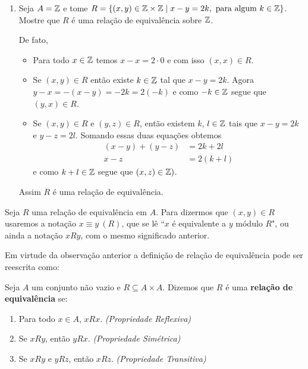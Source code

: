 \begin{exemplos}
\begin{enumerate}
		\item Seja $A = \mathbb{Z}$ e tome $R = \{(x,y)\in \mathbb{Z} \times \mathbb{Z} \mid x - y = 2k, \mbox{ para algum } k \in \mathbb{Z}\}$. Mostre que $R$
		é uma rela{\c c}{\~a}o de equival{\^e}ncia sobre $\mathbb{Z}$.
		\begin{solucao}
			De fato,
			\begin{itemize}
				\item Para todo $x\in\mathbb{Z}$ temos $x - x = 2\cdot0$ e com isso $(x,x) \in R$.
				\item Se $(x,y) \in R$ então existe $k \in \mathbb{Z}$ tal que $x - y = 2k$. Agora $y - x = -(x - y) = -2k = 2 (-k)$ 
				e como $-k \in \mathbb{Z}$ segue que $(y,x) \in R$.
				\item Se $(x,y) \in R$ e $(y,z) \in R$, então existem $k$, $l\in \mathbb{Z}$ tais que $x - y = 2k$ e $y - z = 2l$.
				Somando essas duas equações obtemos
				\begin{align*}
					(x - y) + (y - z) &= 2k + 2l\\
					x - z &= 2(k + l)
				\end{align*}
				e como $k + l \in \mathbb{Z}$ segue que $(x,z) \in \mathbb{Z})$.
			\end{itemize}
			Assim $R$ é uma relação de equivalência.
		\end{solucao}
	\end{enumerate}
\end{exemplos}
\begin{observacao}
	Seja $R$ uma rela{\c c}{\~a}o de equival{\^e}ncia em $A$. Para dizermos que $(x,y) \in R$ usaremos a nota{\c c}{\~a}o $x\equiv y\ (R)$, que se l{\^e} ``$x$ é equivalente a $y$ m{\'o}dulo $R$", ou ainda a nota{\c c}{\~a}o $xRy$, com o mesmo significado anterior.
\end{observacao}

Em virtude da observação anterior a definição de relação de equivalência pode ser reescrita como:

\begin{definicao}
	Seja $A$ um conjunto n{\~a}o vazio e $R\subseteq A \times A$. Dizemos que $R$ {\'e} uma \textbf{rela{\c c}{\~a}o de equival{\^e}ncia} se:
	\begin{enumerate}[label={\roman*})]
		\item Para todo $x \in A$, $xRx$. \textit{(Propriedade Reflexiva)}
		\item Se $xRy$, então $yRx$. \textit{(Propriedade Simétrica)}
		\item Se $xRy$ e $yRz$, então $xRz$. \textit{(Propriedade Transitiva)}
	\end{enumerate}
\end{definicao}

